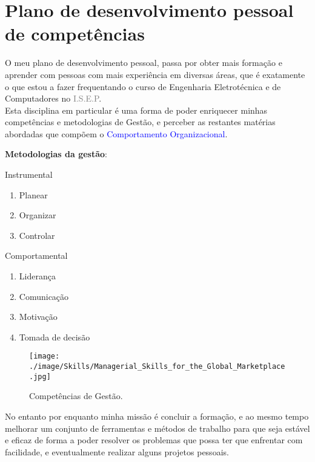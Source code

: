 \section{Plano de desenvolvimento pessoal de competências}
\qquad O meu plano de desenvolvimento pessoal, passa por obter mais formação e aprender com pessoas com mais experiência em diversas áreas, que é exatamente o que estou a fazer frequentando o curso de Engenharia Eletrotécnica e de Computadores no \textcolor{gray}{I.S.E.P}.\\
Esta disciplina em particular é uma forma de poder enriquecer minhas competências e metodologias de Gestão, e perceber as restantes matérias abordadas que compõem o \textcolor{blue}{Comportamento Organizacional}.\\
\begin{minipage}{8.5cm}
	\textbf{Metodologias da gestão}: \cite{book-9}
	\emptyline
	\begin{minipage}{3.1cm}
		Instrumental
		\begin{enumerate}
			\setlength\itemsep{-0.3em}
			\item Planear
			\item Organizar
			\item Controlar\\
		\end{enumerate}
	\end{minipage}
	\begin{minipage}{5cm}
		Comportamental
		\begin{enumerate}
			\setlength\itemsep{-0.3em}
			\item Liderança
			\item Comunicação
			\item Motivação
			\item Tomada de decisão
		\end{enumerate}
	\end{minipage}
\end{minipage}
\begin{minipage}{10cm}
\begin{figure}[H]
	\flushleft
	\texttt{[image: ./image/Skills/Managerial\_Skills\_for\_the\_Global\_Marketplace.jpg]}
	\caption{Competências de Gestão. \cite{book-6}}
\end{figure}
\end{minipage}
\emptyline
No entanto por enquanto minha missão é concluir a formação, e ao mesmo tempo melhorar um conjunto de ferramentas e métodos de trabalho para que seja estável e eficaz de forma a poder resolver os problemas que possa ter que enfrentar com facilidade, e eventualmente realizar alguns projetos pessoais.
\newpage
